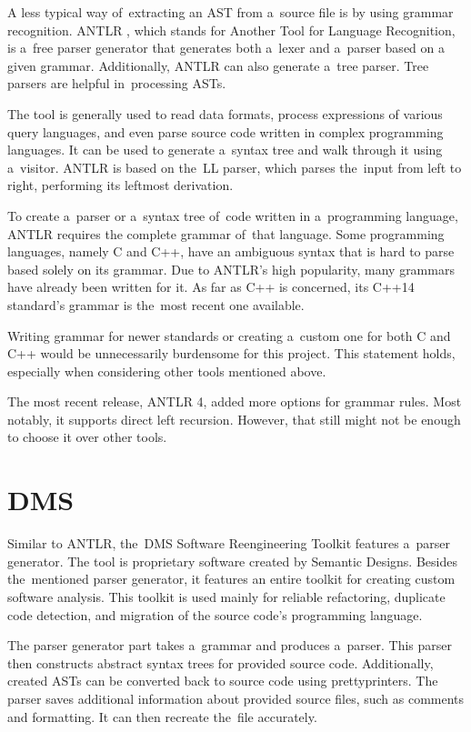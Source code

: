 A less typical way of~extracting an AST from a~source file is by using grammar
recognition.
ANTLR \citep{antlr:online}, which stands for Another Tool for 
Language Recognition, is a~free 
parser generator that generates both a~lexer and a~parser based on 
a given grammar.
Additionally, ANTLR can also generate a~tree parser.
Tree parsers are helpful in~processing ASTs.

The tool is generally used to read data formats, process expressions 
of various query languages, and even parse source code written in complex 
programming languages.
It can be used to generate a~syntax tree and walk through it using a~visitor.
ANTLR is based on the~LL parser, which parses the~input from left to right, 
performing its leftmost derivation.

To create a~parser or a~syntax tree of~code written in a~programming language, 
ANTLR requires the complete grammar of~that language.
Some programming languages, namely C and C++, have an ambiguous syntax that 
is hard to parse based solely on its grammar.
Due to ANTLR's high popularity, many grammars have already been written 
for it.
As far as C++ is concerned, its C++14 standard's grammar is the~most recent 
one available.

Writing grammar for newer standards or creating a~custom one for both C and 
C++ would be unnecessarily burdensome for this project.
This statement holds, especially when considering other tools mentioned above.

The most recent release, ANTLR 4, added more options for grammar rules.
Most notably, it supports direct left recursion.
However, that still might not be enough to choose it over other tools.


\section{DMS}

Similar to ANTLR, the~DMS Software Reengineering Toolkit \citep{dms:online}
features a~parser generator.
The tool is proprietary software created by Semantic Designs.
Besides the~mentioned parser generator, it features an entire toolkit for 
creating custom software analysis.
This toolkit is used mainly for reliable refactoring, duplicate code 
detection, and migration of the source code's programming language.

The parser generator part takes a~grammar and produces a~parser.
This parser then constructs abstract syntax trees for provided source code.
Additionally, created ASTs can be converted back to source code using 
prettyprinters.
The parser saves additional information about provided source files, such as 
comments and formatting.
It can then recreate the~file accurately.

